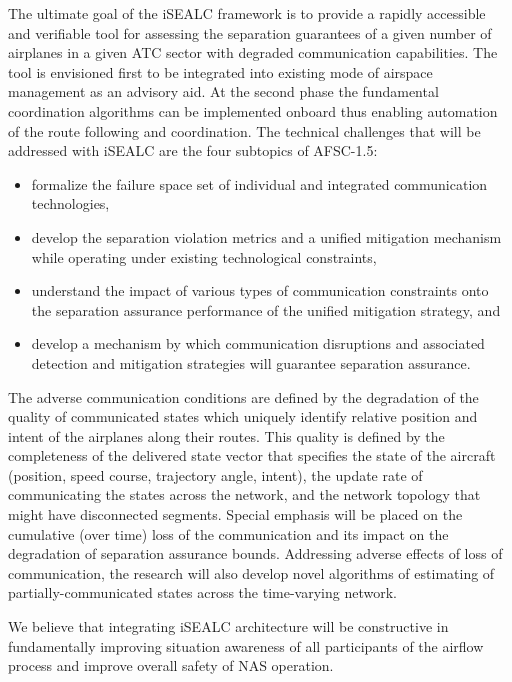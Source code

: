 \documentclass[letter,onecolumn,12pt]{aiaa-tc}
\newcommand{\1}{1_n}
\begin{document}
The ultimate goal of the iSEALC framework is to provide a rapidly accessible and verifiable tool for assessing the separation guarantees of a given number of airplanes in a given ATC sector with degraded communication capabilities.  The tool is  envisioned first to be integrated into existing mode of airspace management as an advisory aid. At the second phase the fundamental coordination algorithms can be implemented onboard thus enabling automation of the route following and coordination. The technical challenges that will be addressed with iSEALC are the four subtopics of AFSC-1.5:
\vspace{-2mm}
\begin{itemize}
\setlength{\itemsep}{-4pt}
    \item formalize the failure space set of individual and integrated communication technologies,
    \item develop the separation violation metrics and a unified mitigation mechanism while operating under existing technological constraints,
    \item understand the impact of various types of communication constraints onto the separation assurance performance of the unified mitigation strategy, and
    \item develop a mechanism by which communication disruptions and associated detection and mitigation strategies will guarantee separation assurance.
\end{itemize}
\vspace{-2mm}

The adverse communication conditions are defined by the degradation of the quality of communicated states which uniquely identify relative position and intent of the airplanes along their routes. This quality is defined by the completeness of the delivered state vector that specifies the state of the aircraft (position, speed course, trajectory angle, intent), the update rate of communicating the states across the network, and the network topology that might have disconnected segments. Special emphasis will be placed on the cumulative (over time) loss of the communication and its impact on the degradation of separation assurance bounds. Addressing adverse effects of loss of communication, the research will also develop novel algorithms of estimating of partially-communicated states across the time-varying network.

We believe that integrating iSEALC architecture will be constructive in fundamentally improving situation awareness of all participants of the airflow process and improve overall safety of NAS operation.
\end{document}
